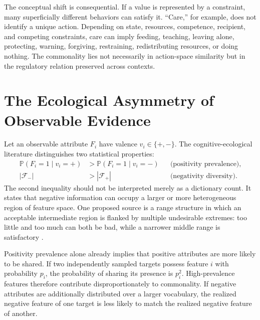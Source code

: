 \documentclass[11pt]{article}
\newcommand{\Pp}{\mathbb{P}}
\begin{document}
The conceptual shift is consequential. If a value is represented by a constraint, many superficially different behaviors can satisfy it. ``Care,'' for example, does not identify a unique action. Depending on state, resources, competence, recipient, and competing constraints, care can imply feeding, teaching, leaving alone, protecting, warning, forgiving, restraining, redistributing resources, or doing nothing. The commonality lies not necessarily in action-space similarity but in the regulatory relation preserved across contexts.

\section{The Ecological Asymmetry of Observable Evidence}

Let an observable attribute $F_i$ have valence $v_i\in\{+,-\}$. The cognitive-ecological literature distinguishes two statistical properties:
\begin{align}
    \Pp(F_i=1\mid v_i=+) &>
    \Pp(F_i=1\mid v_i=-)
    &&\text{(positivity prevalence)},\\
    |\mathcal{F}_{-}| &>
    |\mathcal{F}_{+}|
    &&\text{(negativity diversity)}.
\end{align}
The second inequality should not be interpreted merely as a dictionary count. It states that negative information can occupy a larger or more heterogeneous region of feature space. One proposed source is a range structure in which an acceptable intermediate region is flanked by multiple undesirable extremes: too little and too much can both be bad, while a narrower middle range is satisfactory \citep{AlvesKochUnkelbach2017Good,UnkelbachKochAlves2019}.

Positivity prevalence alone already implies that positive attributes are more likely to be shared. If two independently sampled targets possess feature $i$ with probability $p_i$, the probability of sharing its presence is $p_i^2$. High-prevalence features therefore contribute disproportionately to commonality. If negative attributes are additionally distributed over a larger vocabulary, the realized negative feature of one target is less likely to match the realized negative feature of another.
\end{document}
